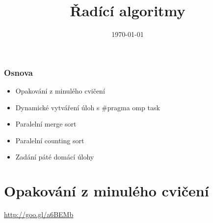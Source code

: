 \documentclass[usenames,dvipsnames,9pt]{beamer}
\title{Řadící algoritmy}
\date{\today}
\institute{B4B36PDV -- Paralelní a distribuované výpočty}
\begin{document}
\maketitle

\begin{frame}
  \frametitle{Osnova}
  \begin{itemize}
    \item Opakování z minulého cvičení\\[1.5em]
    \item Dynamické vytváření úloh s \#pragma omp task
    \item Paralelní merge sort
    \item Paralelní counting sort\\[1.5em]
    \item Zadání páté domácí úlohy
  \end{itemize}
\end{frame}


\section{Opakování z minulého cvičení}

\begin{frame}[standout]
  \Huge
  \url{http://goo.gl/a6BEMb}
\end{frame}
\end{document}
